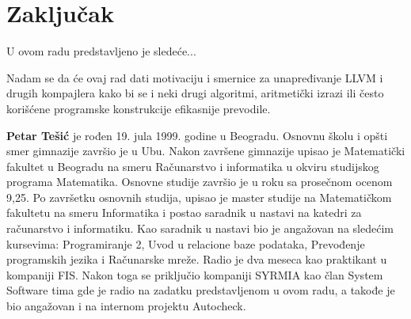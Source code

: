 \documentclass[12pt,oneside]{memoir}
\begin{document}
\cite{stulova2019overview}
\cite{lit}
\cite{llvm}
\cite{lit}
\chapter{Zaključak}
U ovom radu predstavljeno je sledeće...

Nadam se da će ovaj rad dati motivaciju i smernice za unapređivanje LLVM i drugih kompajlera kako 
bi se i neki drugi algoritmi, aritmetički izrazi ili često korišćene programske konstrukcije 
efikasnije prevodile.
\literatura

\backmatter

\begin{biografija}
\textbf{Petar Tešić}  je rođen 19. jula 1999. godine u Beogradu. Osnovnu školu i opšti smer gimnazije završio je u Ubu. Nakon završene gimnazije upisao je Matematički fakultet u Beogradu na smeru Računarstvo i informatika u okviru studijskog programa Matematika. Osnovne studije završio je u roku sa prosečnom ocenom 9,25. Po završetku osnovnih studija, upisao je master studije na Matematičkom fakultetu na smeru Informatika i postao saradnik u nastavi na katedri za računarstvo i informatiku. Kao saradnik u nastavi bio je angažovan na sledećim kursevima: Programiranje 2, Uvod u relacione baze podataka, Prevođenje programskih jezika i Računarske mreže. Radio je dva meseca kao praktikant u kompaniji FIS. Nakon toga se priključio kompaniji SYRMIA kao član System Software tima gde je radio na zadatku predstavljenom u ovom radu, a takođe je bio angažovan i na internom projektu Autocheck.
\end{biografija}
\end{document}
